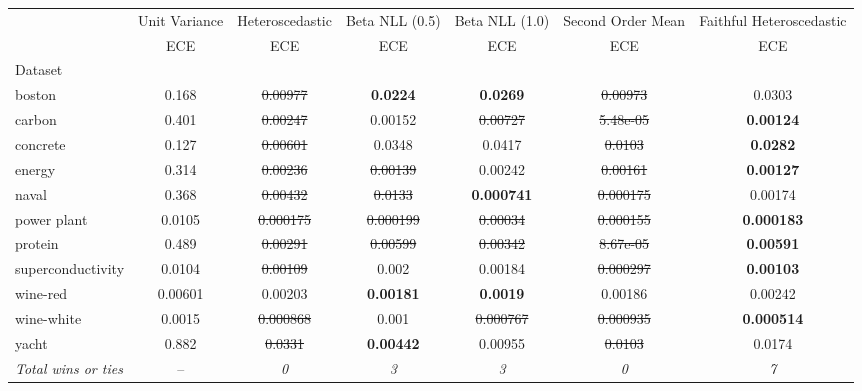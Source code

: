 \begin{tabular}{l|c|c|c|c|c|c}
\toprule
{} & {Unit Variance} & {Heteroscedastic} & {Beta NLL (0.5)} & {Beta NLL (1.0)} & {Second Order Mean} & {Faithful Heteroscedastic} \\
{} & {ECE} & {ECE} & {ECE} & {ECE} & {ECE} & {ECE} \\
{Dataset} & {} & {} & {} & {} & {} & {} \\
\midrule
boston & 0.168 & \sout{0.00977} & \textbf{0.0224} & \textbf{0.0269} & \sout{0.00973} & 0.0303 \\
carbon & 0.401 & \sout{0.00247} & 0.00152 & \sout{0.00727} & \sout{5.48e-05} & \textbf{0.00124} \\
concrete & 0.127 & \sout{0.00601} & 0.0348 & 0.0417 & \sout{0.0103} & \textbf{0.0282} \\
energy & 0.314 & \sout{0.00236} & \sout{0.00139} & 0.00242 & \sout{0.00161} & \textbf{0.00127} \\
naval & 0.368 & \sout{0.00432} & \sout{0.0133} & \textbf{0.000741} & \sout{0.000175} & 0.00174 \\
power plant & 0.0105 & \sout{0.000175} & \sout{0.000199} & \sout{0.00034} & \sout{0.000155} & \textbf{0.000183} \\
protein & 0.489 & \sout{0.00291} & \sout{0.00599} & \sout{0.00342} & \sout{8.67e-05} & \textbf{0.00591} \\
superconductivity & 0.0104 & \sout{0.00109} & 0.002 & 0.00184 & \sout{0.000297} & \textbf{0.00103} \\
wine-red & 0.00601 & 0.00203 & \textbf{0.00181} & \textbf{0.0019} & 0.00186 & 0.00242 \\
wine-white & 0.0015 & \sout{0.000868} & 0.001 & \sout{0.000767} & \sout{0.000935} & \textbf{0.000514} \\
yacht & 0.882 & \sout{0.0331} & \textbf{0.00442} & 0.00955 & \sout{0.0103} & 0.0174 \\
\textit{{Total wins or ties}} & -- & \textit{0} & \textit{3} & \textit{3} & \textit{0} & \textit{7} \\
\bottomrule
\end{tabular}
